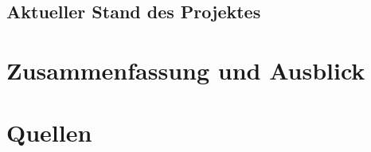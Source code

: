 \documentclass{article}
\begin{document}
\subsection{Aktueller Stand des Projektes}

\section{Zusammenfassung und Ausblick}

\section*{Quellen}


\nocite{*}

\end{document}
